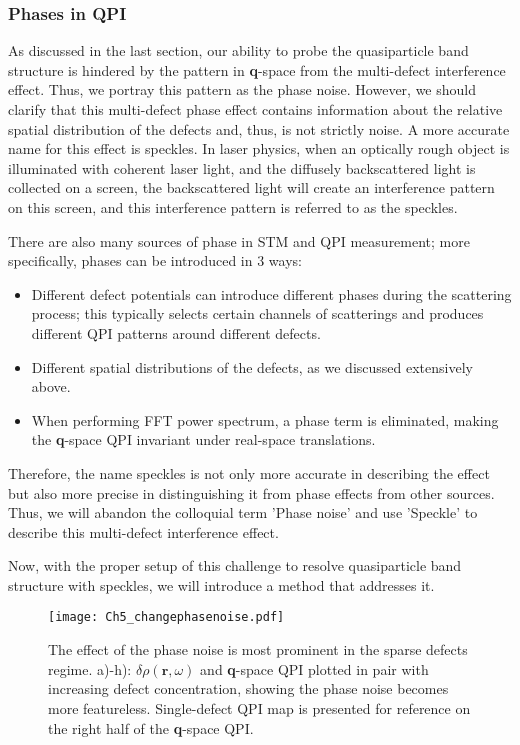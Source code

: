 \subsubsection{Phases in QPI}
As discussed in the last section, our ability to probe the quasiparticle band structure is hindered by the pattern in \textbf{q}-space from the multi-defect interference effect. Thus, we portray this pattern as the phase noise. However, we should clarify that this multi-defect phase effect contains information about the relative spatial distribution of the defects and, thus, is not strictly noise. A more accurate name for this effect is speckles. In laser physics, when an optically rough object is illuminated with coherent laser light, and the diffusely backscattered light is collected on a screen, the backscattered light will create an interference pattern on this screen, and this interference pattern is referred to as the speckles\cite{ReviewLaserSpeckle}.

There are also many sources of phase in \ac{STM} and \ac{QPI} measurement; more specifically, phases can be introduced in 3 ways: 
\begin{itemize}
	\item Different defect potentials can introduce different phases during the scattering process; this typically selects certain channels of scatterings and produces different QPI patterns around different defects. \cite{chenAtomicallyResolvedDefectEngineering2024}
	\item Different spatial distributions of the defects, as we discussed extensively above. 
	\item When performing FFT power spectrum, a phase term is eliminated, making the \textbf{q}-space \ac{QPI} invariant under real-space translations.
\end{itemize}

Therefore, the name speckles is not only more accurate in describing the effect but also more precise in distinguishing it from phase effects from other sources. Thus, we will abandon the colloquial term 'Phase noise' and use 'Speckle' to describe this multi-defect interference effect. 

Now, with the proper setup of this challenge to resolve quasiparticle band structure with speckles, we will introduce a method that addresses it. 

\begin{figure}
	\texttt{[image: Ch5\_changephasenoise.pdf]} 
	\centering
	\caption{The effect of the phase noise is most prominent in the sparse defects regime. a)-h): $\delta\rho(\textbf{r},\omega)$ and \textbf{q}-space QPI plotted in pair with increasing defect concentration, showing the phase noise becomes more featureless. Single-defect QPI map is presented for reference on the right half of the \textbf{q}-space QPI.}
	\label{fig:ch5_changephasenoise}
\end{figure}